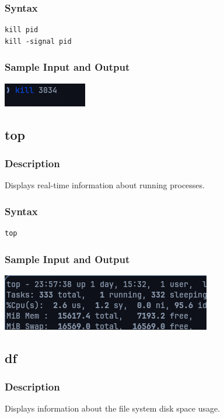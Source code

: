 \subsubsection{Syntax}
\begin{verbatim}
kill pid
kill -signal pid
\end{verbatim}

\subsubsection{Sample Input and Output}
\includegraphics[]{Cycle_1//Outputs/kill.png}

\subsection{top}
\subsubsection{Description}
Displays real-time information about running processes.

\subsubsection{Syntax}
\begin{verbatim}
top
\end{verbatim}

\subsubsection{Sample Input and Output}
 \includegraphics[]{Cycle_1//Outputs/top.png}

\subsection{df}
\subsubsection{Description}
Displays information about the file system disk space usage.


